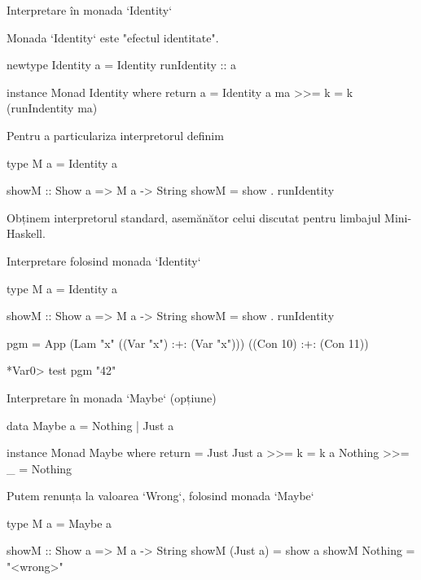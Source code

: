 \documentclass[xcolor=pdftex,romanian,colorlinks]{beamer}
\begin{document}
\begin{frame}[fragile]{Interpretare în monada `Identity`}


Monada `Identity` este "efectul identitate".

\begin{asciihs}
newtype Identity a = Identity { runIdentity :: a } 
 
instance Monad Identity where
    return a           = Identity a   
    ma >>= k = k (runIndentity ma) 
\end{asciihs} 
\pause

Pentru a particulariza interpretorul definim 
    
\begin{asciihs}
type M a = Identity a

showM :: Show a => M a -> String
showM = show . runIdentity
\end{asciihs}
\pause 

Obținem interpretorul standard, 
asemănător celui discutat pentru limbajul Mini-Haskell.
\end{frame}


\begin{frame}[fragile]{Interpretare folosind monada `Identity`}


\begin{asciihs}
type M a = Identity a

showM :: Show a => M a -> String
showM = show . runIdentity
\end{asciihs}


\begin{asciihs}
pgm = App 
          (Lam "x" ((Var "x") :+: (Var "x")))
          ((Con 10) :+:  (Con 11))
\end{asciihs}

\begin{asciihs}
*Var0> test pgm
"42"
\end{asciihs}
\end{frame}



\begin{frame}[fragile]{Interpretare în monada `Maybe` (opțiune)}



\begin{asciihs}
data Maybe a = Nothing | Just a

instance Monad Maybe where
  return = Just
  Just a  >>= k   = k a
  Nothing >>= _   = Nothing
\end{asciihs}

Putem renunța la valoarea `Wrong`, folosind monada `Maybe`

\begin{asciihs}

type M a = Maybe a

showM :: Show a => M a -> String
showM (Just a) = show a
showM Nothing  = "<wrong>"
\end{asciihs}
\end{frame}
\end{document}
